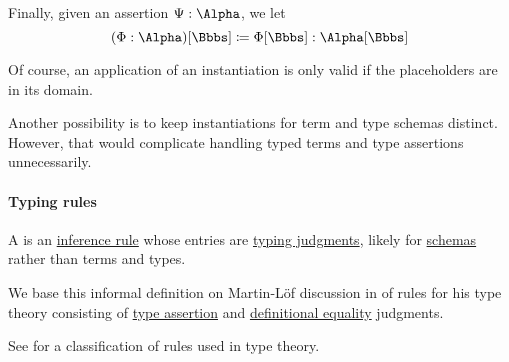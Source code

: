 \begin{definition}
\begin{thmenum}
     Finally, given an assertion \( \Psi: \Alpha \), we let
    \begin{equation}\label{eq:def:lambda_schema_instantiation/assertion}
      (\Phi: \Alpha)[\Bbbs] \coloneqq \Phi[\Bbbs]: \Alpha[\Bbbs]
    \end{equation}
  \end{thmenum}
\end{definition}
\begin{comments}
  \item Of course, an application of an instantiation is only valid if the placeholders are in its domain.

  \item Another possibility is to keep instantiations for term and type schemas distinct. However, that would complicate handling typed terms and type assertions unnecessarily.
\end{comments}

\paragraph{Typing rules}

\begin{concept}\label{con:typing_rule}
  A  is an \hyperref[def:inference_rule]{inference rule} whose entries are \hyperref[rem:typing_judgments]{typing judgments}, likely for \hyperref[con:schemas_and_instances]{schemas} rather than terms and types.
\end{concept}
\begin{comments}
  \item We base this informal definition on Martin-L\"of discussion in \cite{MartinLöf1984IntuitionisticTypeTheory} of rules for his type theory consisting of \hyperref[def:type_assertion]{type assertion} and \hyperref[con:equality]{definitional equality} judgments.

  \item See  for a classification of rules used in type theory.
\end{comments}

